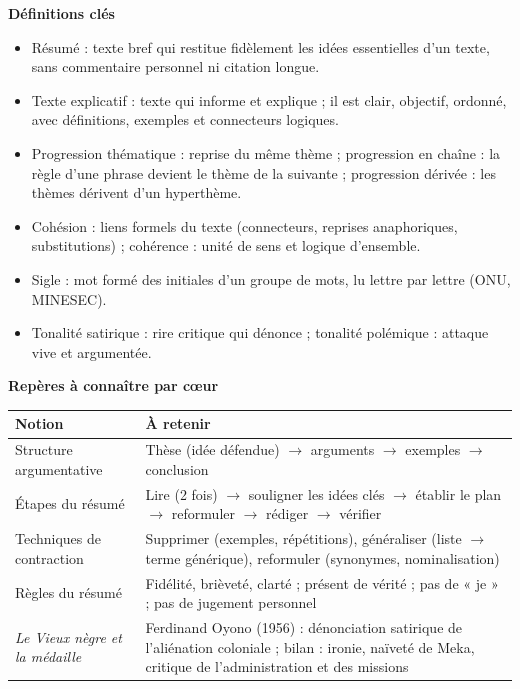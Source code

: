 \documentclass[11pt]{article}
\newcommand{\cle}[1]{{\popxbold\color{popdark}#1}}
\begin{document}
\begin{bilan}
\textbf{Définitions clés}
\begin{itemize}
  \item \cle{Résumé} : texte bref qui restitue fidèlement les idées essentielles d'un texte, sans commentaire personnel ni citation longue.
  \item \cle{Texte explicatif} : texte qui informe et explique ; il est clair, objectif, ordonné, avec définitions, exemples et connecteurs logiques.
  \item \cle{Progression thématique} : reprise du même thème ; \cle{progression en chaîne} : la règle d'une phrase devient le thème de la suivante ; \cle{progression dérivée} : les thèmes dérivent d'un hyperthème.
  \item \cle{Cohésion} : liens formels du texte (connecteurs, reprises anaphoriques, substitutions) ; \cle{cohérence} : unité de sens et logique d'ensemble.
  \item \cle{Sigle} : mot formé des initiales d'un groupe de mots, lu lettre par lettre (ONU, MINESEC).
  \item \cle{Tonalité satirique} : rire critique qui dénonce ; \cle{tonalité polémique} : attaque vive et argumentée.
\end{itemize}

\textbf{Repères à connaître par cœur}
\begin{center}
\begin{tabularx}{\linewidth}{|l|X|}
\hline
\rowcolor{popblueL} \textbf{Notion} & \textbf{À retenir} \\
\hline
Structure argumentative & Thèse (idée défendue) $\rightarrow$ arguments $\rightarrow$ exemples $\rightarrow$ conclusion \\
\hline
Étapes du résumé & Lire (2 fois) $\rightarrow$ souligner les idées clés $\rightarrow$ établir le plan $\rightarrow$ reformuler $\rightarrow$ rédiger $\rightarrow$ vérifier \\
\hline
Techniques de contraction & Supprimer (exemples, répétitions), généraliser (liste $\rightarrow$ terme générique), reformuler (synonymes, nominalisation) \\
\hline
Règles du résumé & Fidélité, brièveté, clarté ; présent de vérité ; pas de « je » ; pas de jugement personnel \\
\hline
\emph{Le Vieux nègre et la médaille} & Ferdinand Oyono (1956) : dénonciation satirique de l'aliénation coloniale ; bilan : ironie, naïveté de Meka, critique de l'administration et des missions \\
\hline
\end{tabularx}
\end{center}


\end{bilan}
\end{document}
